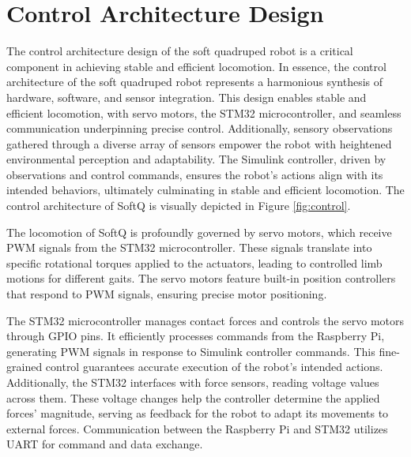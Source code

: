\section{Control Architecture Design}
The control architecture design of the soft quadruped robot is a critical component in achieving stable and efficient locomotion. In essence, the control architecture of the soft quadruped robot represents a harmonious synthesis of hardware, software, and sensor integration. This design enables stable and efficient locomotion, with servo motors, the STM32 microcontroller, and seamless communication underpinning precise control. Additionally, sensory observations gathered through a diverse array of sensors empower the robot with heightened environmental perception and adaptability. The Simulink controller, driven by observations and control commands, ensures the robot's actions align with its intended behaviors, ultimately culminating in stable and efficient locomotion. The control architecture of SoftQ is visually depicted in Figure \ref{fig:control}.


The locomotion of SoftQ is profoundly governed by servo motors, which receive \ac{PWM} signals from the STM32 microcontroller. These signals translate into specific rotational torques applied to the actuators, leading to controlled limb motions for different gaits. The servo motors feature built-in position controllers that respond to PWM signals, ensuring precise motor positioning.

The STM32 microcontroller manages contact forces and controls the servo motors through \ac{GPIO} pins. It efficiently processes commands from the Raspberry Pi, generating PWM signals in response to Simulink controller commands. This fine-grained control guarantees accurate execution of the robot's intended actions. Additionally, the STM32 interfaces with force sensors, reading voltage values across them. These voltage changes help the controller determine the applied forces' magnitude, serving as feedback for the robot to adapt its movements to external forces. Communication between the Raspberry Pi and STM32 utilizes \ac{UART} for command and data exchange.

